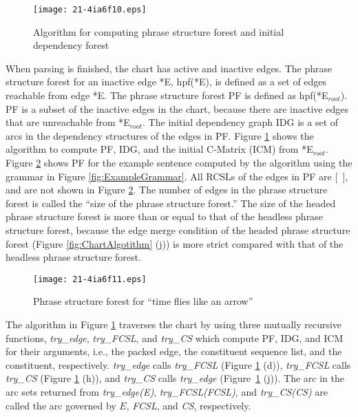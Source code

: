 \documentclass[english]{jnlp_1.4_rep}
\theoremstyle{break}
\theoremstyle{plain}
\theoremstyle{plain}
\begin{document}
\begin{figure}[b]
 \begin{center}
\texttt{[image: 21-4ia6f10.eps]}
 \end{center}
\caption{Algorithm for computing phrase structure forest and initial dependency forest}
\label{fig:HPF_IDF_Algorithm}
\end{figure}

When parsing is finished, the chart has active and inactive edges. The
phrase structure forest for an inactive edge *E, hpf(*E), is defined as a
set of edges reachable from edge *E. The phrase structure forest PF is
defined as hpf(*E$_\mathit{root}$). PF is a subset of the inactive edges in
the chart, because there are inactive edges that are unreachable from
*E$_\mathit{root}$. The initial dependency graph IDG is a set of arcs in the
dependency structures of the edges in
PF. Figure \ref{fig:HPF_IDF_Algorithm} shows the algorithm to compute PF,
IDG, and the initial C-Matrix (ICM) from
*E$_\mathit{root}$. Figure \ref{fig:PDGParseForest} shows PF for the example
sentence computed by the algorithm using the grammar in
Figure \ref{fig:ExampleGrammar}. All RCSLs of the edges in PF are [~], and
are not shown in Figure \ref{fig:PDGParseForest}. The number of edges in the
phrase structure forest is called the ``size of the phrase structure forest.'' The size of the
headed phrase structure forest is more than or equal to that of the headless
phrase structure forest, because the edge merge condition of the headed phrase structure
forest (Figure \ref{fig:ChartAlgotithm} (j)) is more strict compared with
that of the headless phrase structure forest.

\begin{figure}[b]
 \begin{center}
\texttt{[image: 21-4ia6f11.eps]}
 \end{center}
\caption{Phrase structure forest for ``time flies like an arrow''}
\label{fig:PDGParseForest}
\end{figure}

The algorithm in Figure \ref{fig:HPF_IDF_Algorithm} traverses the chart
by using three mutually recursive functions, \textit{try\_edge}, \textit{try\_FCSL}, and
\textit{try\_CS} which compute PF, IDG, and ICM for their arguments, i.e., the
packed edge, the constituent sequence list, and the constituent,
respectively. \textit{try\_edge} calls \textit{try\_FCSL}
(Figure \ref{fig:HPF_IDF_Algorithm} (d)), \textit{try\_FCSL} calls \textit{try\_CS}
(Figure \ref{fig:HPF_IDF_Algorithm} (h)), and \textit{try\_CS} calls \textit{try\_edge}
\linebreak
(Figure~\ref{fig:HPF_IDF_Algorithm} (j)). The arc in the arc sets
returned from \textit{try\_edge(E)}, \textit{try\_FCSL(FCSL)}, and \textit{try\_CS(CS)} are called
the arc governed by $E$, \textit{FCSL}, and \textit{CS}, respectively.
\end{document}
